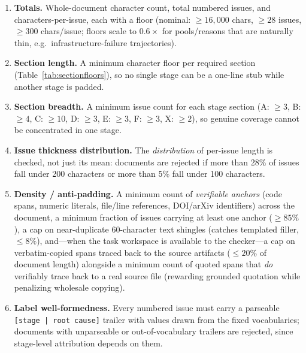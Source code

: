 \begin{enumerate}
  \item \textbf{Totals.} Whole-document character count, total numbered
  issues, and characters-per-issue, each with a floor (nominal:
  $\geq 16{,}000$ chars, $\geq 28$ issues, $\geq 300$ chars/issue; floors
  scale to $0.6\times$ for pools/reasons that are naturally thin, e.g.\
  infrastructure-failure trajectories).

  \item \textbf{Section length.} A minimum character floor per required
  section (Table~\ref{tab:sectionfloors}), so no single stage can be a
  one-line stub while another stage is padded.

  \item \textbf{Section breadth.} A minimum issue count for each stage
  section (A: $\geq 3$, B: $\geq 4$, C: $\geq 10$, D: $\geq 3$, E:
  $\geq 3$, F: $\geq 3$, X: $\geq 2$), so genuine coverage cannot be
  concentrated in one stage.

  \item \textbf{Issue thickness distribution.} The \emph{distribution} of
  per-issue length is checked, not just its mean: documents are rejected
  if more than 28\% of issues fall under 200 characters or more than 5\%
  fall under 100 characters.

  \item \textbf{Density / anti-padding.} A minimum count of
  \emph{verifiable anchors} (code spans, numeric literals, file/line
  references, DOI/arXiv identifiers) across the document, a minimum
  fraction of issues carrying at least one anchor ($\geq 85\%$), a cap on
  near-duplicate 60-character text shingles (catches templated filler,
  $\leq 8\%$), and---when the task workspace is available to the
  checker---a cap on verbatim-copied spans traced back to the source
  artifacts ($\leq 20\%$ of document length) alongside a minimum count of
  quoted spans that \emph{do} verifiably trace back to a real source file
  (rewarding grounded quotation while penalizing wholesale copying).

  \item \textbf{Label well-formedness.} Every numbered issue must carry a
  parseable \texttt{[stage | root cause]} trailer with values drawn from
  the fixed vocabularies; documents with unparseable or out-of-vocabulary
  trailers are rejected, since stage-level attribution depends on them.
\end{enumerate}

